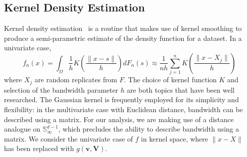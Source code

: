 
\subsection{Kernel Density Estimation}
Kernel density estimation~\citep{parzen1962} is a routine that makes use of 
    kernel smoothing to produce a semi-parametric estimate of the density
    function for a dataset.  In a univariate case,
    \[
        f_n(x) = 
            \int_{\Omega}\frac{1}{h}
                K\left(\frac{\lVert x - s\rVert}{h}\right)dF_n(s) \approx
            \frac{1}{nh}\sum_{j = 1}^n
                K\left(\frac{\lVert x - X_j\rVert}{h}\right)
    \]
    where $X_j$ are random replicates from $F$.  The choice of kernel function 
    $K$ and selection of the bandwidth parameter $h$ are both topics that have
    been well researched.  The Gaussian kernel is frequently employed for its 
    simplicity and flexibility: in the multivariate case with Euclidean 
    distance, bandwidth can be described using a matrix.  For our analysis, we
    are making use of a distance analogue on $\mathbb{S}_{\infty}^{d-1}$, which
    precludes the ability to describe bandwidth using a matrix.  We consider
    the univariate case of $f$ in kernel space, where $\lVert x - X\rVert$ has
    been replaced with $g(\bm{v}, \bm{V})$.

